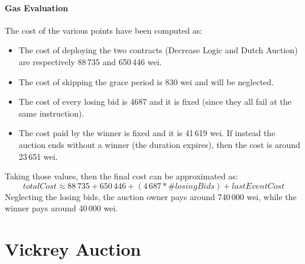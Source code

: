 \documentclass[11pt, a4paper]{report}
\begin{document}
		\paragraph*{Gas Evaluation}
		The cost of the various points have been computed as: 
		\begin{itemize}
			\item The cost of deploying the two contracts (Decrease Logic and Dutch Auction) are respectively 88\,735 and 650\,446 wei. 
			\item The cost of skipping the grace period is 830 wei and will be neglected.
			\item The cost of every losing bid is 4687 and it is fixed (since they all fail at the same instruction). 
			\item The cost paid by the winner is fixed and it is 41\,619 wei. If instead the auction ends without a winner (the duration expires), then the cost is around 23\,651 wei.
		\end{itemize}
		Taking those values, then the final cost can be approximated as: $$totalCost \approx 88\,735 + 650\,446 + (4\,687 * \#losingBids) + lastEventCost $$
		Neglecting the losing bids, the auction owner pays around 740\,000 wei, while the winner pays around 40\,000 wei.
			

\section*{Vickrey Auction}
\label{sec:vickreyAuction}
\end{document}
